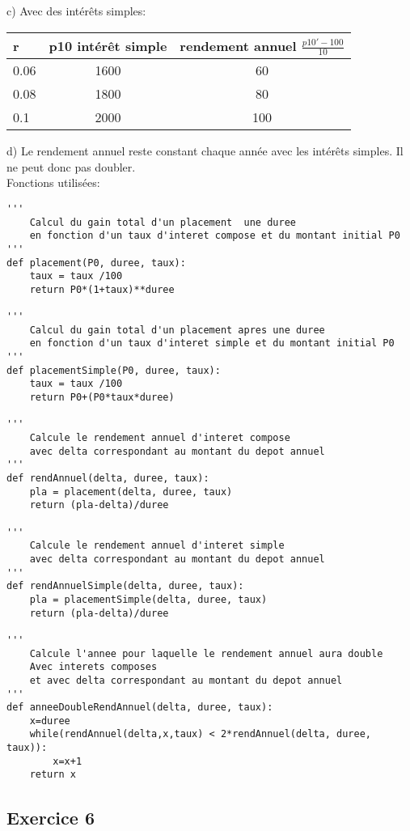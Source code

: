 \documentclass[12pt]{article}
\begin{document}
c) Avec des intérêts simples:
\begin{center}
   \begin{tabularx}{10cm}{ | l | c | c |}
     \hline
     r & p10 intérêt simple & rendement annuel $\frac{p10'-100}{10}$  \\ 
     \hline
     0.06 & 1600 & 60  \\ 
     \hline
     0.08 & 1800 & 80  \\ 
     \hline
     0.1 & 2000 & 100 \\ 
     \hline
   \end{tabularx}
 \end{center}
 
d) Le rendement annuel reste constant chaque année avec les intérêts simples. Il ne peut donc pas doubler.\\

Fonctions utilisées:\\
\begin{lstlisting}
'''
    Calcul du gain total d'un placement  une duree 
    en fonction d'un taux d'interet compose et du montant initial P0
'''
def placement(P0, duree, taux):
    taux = taux /100
    return P0*(1+taux)**duree

'''
    Calcul du gain total d'un placement apres une duree 
    en fonction d'un taux d'interet simple et du montant initial P0
'''
def placementSimple(P0, duree, taux):
    taux = taux /100
    return P0+(P0*taux*duree)   

'''
    Calcule le rendement annuel d'interet compose
    avec delta correspondant au montant du depot annuel
'''
def rendAnnuel(delta, duree, taux):
    pla = placement(delta, duree, taux)
    return (pla-delta)/duree

'''
    Calcule le rendement annuel d'interet simple
    avec delta correspondant au montant du depot annuel
'''    
def rendAnnuelSimple(delta, duree, taux):
    pla = placementSimple(delta, duree, taux)
    return (pla-delta)/duree

'''
    Calcule l'annee pour laquelle le rendement annuel aura double
    Avec interets composes
    et avec delta correspondant au montant du depot annuel
'''
def anneeDoubleRendAnnuel(delta, duree, taux):
    x=duree
    while(rendAnnuel(delta,x,taux) < 2*rendAnnuel(delta, duree, taux)):
        x=x+1
    return x 
\end{lstlisting}

\subsection{Exercice 6 }
\end{document}

